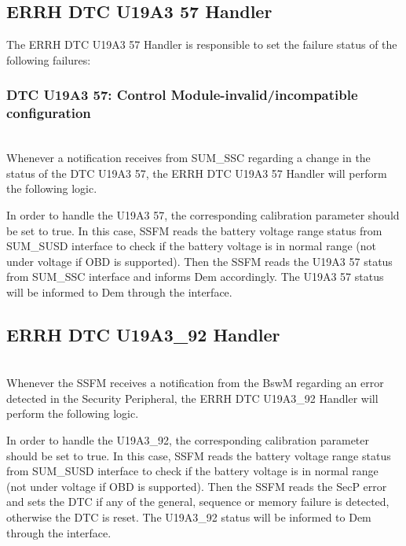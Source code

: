 \subsection{ERRH DTC U19A3 57 Handler}
The ERRH DTC U19A3 57 Handler is responsible to set the failure status of the following failures:

\subsubsection{DTC U19A3 57: Control Module-invalid/incompatible configuration}
\\
Whenever a notification receives from SUM_SSC regarding a change in the status of the DTC  U19A3 57, the ERRH DTC U19A3 57 Handler will perform the following logic.

In order to handle the U19A3 57, the corresponding calibration parameter  should be set to true.
In this case, SSFM reads the battery voltage range status from SUM_SUSD  interface to check if the battery voltage is in normal range (not under voltage if OBD is supported).
Then the SSFM reads the U19A3 57 status from SUM_SSC  interface and informs Dem accordingly.
The U19A3 57 status will be informed to Dem through the  interface.

{       }

\subsection{ERRH DTC U19A3_92 Handler}
\\
Whenever the SSFM receives a notification from the BswM regarding an error detected in the Security Peripheral, the ERRH DTC U19A3_92 Handler will perform the following logic.

In order to handle the U19A3_92, the corresponding calibration parameter  should be set to true.
In this case, SSFM reads the battery voltage range status from SUM_SUSD  interface to check if the battery voltage is in normal range (not under voltage if OBD is supported).
Then the SSFM reads the SecP error and sets the DTC if any of the general, sequence or memory failure is detected, otherwise the DTC is reset.
The U19A3_92 status will be informed to Dem through the  interface.

